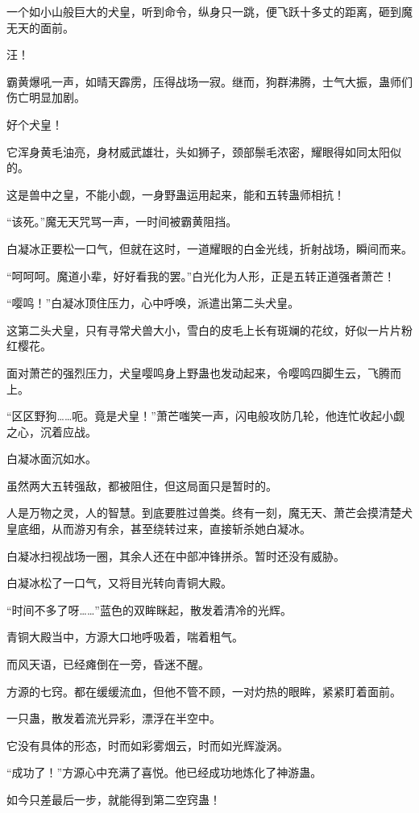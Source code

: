 \begin{this_body}
一个如小山般巨大的犬皇，听到命令，纵身只一跳，便飞跃十多丈的距离，砸到魔无天的面前。

汪！

霸黄爆吼一声，如晴天霹雳，压得战场一寂。继而，狗群沸腾，士气大振，蛊师们伤亡明显加剧。

好个犬皇！

它浑身黄毛油亮，身材威武雄壮，头如狮子，颈部鬃毛浓密，耀眼得如同太阳似的。

这是兽中之皇，不能小觑，一身野蛊运用起来，能和五转蛊师相抗！

“该死。”魔无天咒骂一声，一时间被霸黄阻挡。

白凝冰正要松一口气，但就在这时，一道耀眼的白金光线，折射战场，瞬间而来。

“呵呵呵。魔道小辈，好好看我的罢。”白光化为人形，正是五转正道强者萧芒！

“嘤鸣！”白凝冰顶住压力，心中呼唤，派遣出第二头犬皇。

这第二头犬皇，只有寻常犬兽大小，雪白的皮毛上长有斑斓的花纹，好似一片片粉红樱花。

面对萧芒的强烈压力，犬皇嘤鸣身上野蛊也发动起来，令嘤鸣四脚生云，飞腾而上。

“区区野狗……呃。竟是犬皇！”萧芒嗤笑一声，闪电般攻防几轮，他连忙收起小觑之心，沉着应战。

白凝冰面沉如水。

虽然两大五转强敌，都被阻住，但这局面只是暂时的。

人是万物之灵，人的智慧。到底要胜过兽类。终有一刻，魔无天、萧芒会摸清楚犬皇底细，从而游刃有余，甚至绕转过来，直接斩杀她白凝冰。

白凝冰扫视战场一圈，其余人还在中部冲锋拼杀。暂时还没有威胁。

白凝冰松了一口气，又将目光转向青铜大殿。

“时间不多了呀……”蓝色的双眸眯起，散发着清冷的光辉。

青铜大殿当中，方源大口地呼吸着，喘着粗气。

而风天语，已经瘫倒在一旁，昏迷不醒。

方源的七窍。都在缓缓流血，但他不管不顾，一对灼热的眼眸，紧紧盯着面前。

一只蛊，散发着流光异彩，漂浮在半空中。

它没有具体的形态，时而如彩雾烟云，时而如光辉漩涡。

“成功了！”方源心中充满了喜悦。他已经成功地炼化了神游蛊。

如今只差最后一步，就能得到第二空窍蛊！


\end{this_body}
